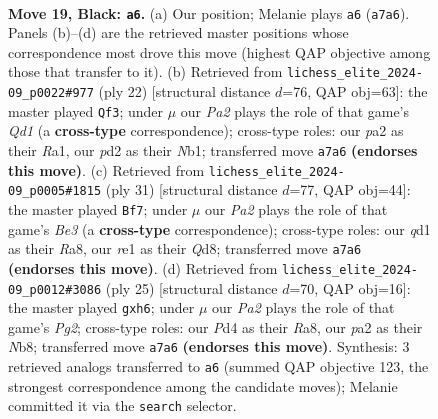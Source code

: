 \documentclass[11pt]{article}
\begin{document}
\clearpage

\begin{figure}[p]\centering
\begin{subfigure}{0.46\textwidth}\centering
\resizebox{\linewidth}{!}{%
\newchessgame
\chessboard[
  setfen={rbbqr1k1/pp3ppp/1P2p1n1/8/3p2P1/1P5B/P2P1PKP/RNBQR3 b - - 2 19},
  showmover=false,
  pgfstyle=straightmove, color=movearrow, markmove={a7-a6}
]}
\caption{}
\end{subfigure}\hfill
\begin{subfigure}{0.46\textwidth}\centering
\resizebox{\linewidth}{!}{%
\newchessgame
\chessboard[
  setfen={r1bq1rk1/2p2ppp/pb3n2/1p2p3/4P3/1BP5/PP3PPP/RNBQR1K1 w - - 0 12},
  showmover=false,
  pgfstyle=straightmove, color=movearrow, markmove={d1-f3}
]}
\caption{}
\end{subfigure}
\\[4pt]
\begin{subfigure}{0.46\textwidth}\centering
\resizebox{\linewidth}{!}{%
\newchessgame
\chessboard[
  setfen={r2qkb1r/4p3/1np1b1Rp/pp2Pp2/3PpP2/4B3/PPPQ1N1P/1K1R1B2 b kq - 1 16},
  showmover=false,
  pgfstyle=straightmove, color=movearrow, markmove={e6-f7}
]}
\caption{}
\end{subfigure}\hfill
\begin{subfigure}{0.46\textwidth}\centering
\resizebox{\linewidth}{!}{%
\newchessgame
\chessboard[
  setfen={rn2kb1r/pp3ppp/2p1p2P/6B1/q2P4/P4P2/1PbQ2P1/R3KBNR b KQkq - 0 13},
  showmover=false,
  pgfstyle=straightmove, color=movearrow, markmove={g7-h6}
]}
\caption{}
\end{subfigure}
\caption{\textbf{Move 19, Black: \texttt{a6}.} (a) Our position; Melanie plays \texttt{a6} (\texttt{a7a6}). Panels (b)--(d) are the retrieved master positions whose correspondence most drove this move (highest QAP objective among those that transfer to it). (b) Retrieved from \texttt{lichess\_elite\_2024-09\_p0022\#977} (ply 22) [structural distance $d$=76, QAP obj=63]: the master played \texttt{Qf3}; under $\mu$ our \emph{Pa2} plays the role of that game's \emph{Qd1} (a \textbf{cross-type} correspondence); cross-type roles: our \emph{p}a2 as their \emph{R}a1, our \emph{p}d2 as their \emph{N}b1; transferred move \texttt{a7a6} \textbf{(endorses this move)}. (c) Retrieved from \texttt{lichess\_elite\_2024-09\_p0005\#1815} (ply 31) [structural distance $d$=77, QAP obj=44]: the master played \texttt{Bf7}; under $\mu$ our \emph{Pa2} plays the role of that game's \emph{Be3} (a \textbf{cross-type} correspondence); cross-type roles: our \emph{q}d1 as their \emph{R}a8, our \emph{r}e1 as their \emph{Q}d8; transferred move \texttt{a7a6} \textbf{(endorses this move)}. (d) Retrieved from \texttt{lichess\_elite\_2024-09\_p0012\#3086} (ply 25) [structural distance $d$=70, QAP obj=16]: the master played \texttt{gxh6}; under $\mu$ our \emph{Pa2} plays the role of that game's \emph{Pg2}; cross-type roles: our \emph{P}d4 as their \emph{R}a8, our \emph{p}a2 as their \emph{N}b8; transferred move \texttt{a7a6} \textbf{(endorses this move)}. Synthesis: 3 retrieved analogs transferred to \texttt{a6} (summed QAP objective 123, the strongest correspondence among the candidate moves); Melanie committed it via the \texttt{search} selector.}
\label{fig:thought-m37}
\end{figure}
\end{document}
